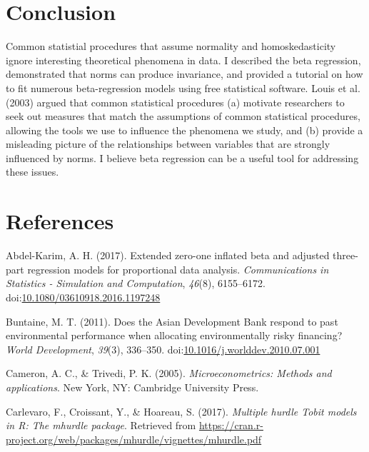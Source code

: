 \documentclass[english,,man]{apa6}
\begin{document}
\hypertarget{conclusion}{%
\section{Conclusion}\label{conclusion}}

Common statistial procedures that assume normality and homoskedasticity ignore interesting theoretical phenomena in data. I described the beta regression, demonstrated that norms can produce invariance, and provided a tutorial on how to fit numerous beta-regression models using free statistical software. Louis et al. (2003) argued that common statistical procedures (a) motivate researchers to seek out measures that match the assumptions of common statistical procedures, allowing the tools we use to influence the phenomena we study, and (b) provide a misleading picture of the relationships between variables that are strongly influenced by norms. I believe beta regression can be a useful tool for addressing these issues.

\newpage

\hypertarget{references}{%
\section{References}\label{references}}

\setlength{\parindent}{-0.5in}
\setlength{\leftskip}{0.5in}

\hypertarget{refs}{}
\leavevmode\hypertarget{ref-abdel2017extended}{}%
Abdel-Karim, A. H. (2017). Extended zero-one inflated beta and adjusted three-part regression models for proportional data analysis. \emph{Communications in Statistics - Simulation and Computation}, \emph{46}(8), 6155--6172. doi:\href{https://doi.org/10.1080/03610918.2016.1197248}{10.1080/03610918.2016.1197248}

\leavevmode\hypertarget{ref-buntaine2011does}{}%
Buntaine, M. T. (2011). Does the Asian Development Bank respond to past environmental performance when allocating environmentally risky financing? \emph{World Development}, \emph{39}(3), 336--350. doi:\href{https://doi.org/10.1016/j.worlddev.2010.07.001}{10.1016/j.worlddev.2010.07.001}

\leavevmode\hypertarget{ref-cameron2005microeconometrics}{}%
Cameron, A. C., \& Trivedi, P. K. (2005). \emph{Microeconometrics: Methods and applications}. New York, NY: Cambridge University Press.

\leavevmode\hypertarget{ref-carlevaro2016multiple}{}%
Carlevaro, F., Croissant, Y., \& Hoareau, S. (2017). \emph{Multiple hurdle Tobit models in R: The mhurdle package}. Retrieved from \url{https://cran.r-project.org/web/packages/mhurdle/vignettes/mhurdle.pdf}
\end{document}
